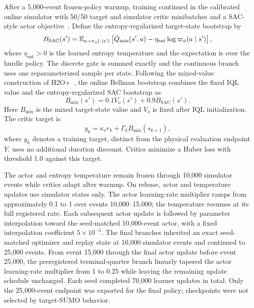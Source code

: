 After a 5,000-event frozen-policy warmup, training continued in the calibrated
online simulator with 50/50 target and simulator critic minibatches and a
SAC-style actor objective~\citep{haarnoja2018soft,haarnoja2018applications}.
Define the entropy-regularized target-state bootstrap by
\begin{equation}
B_{\mathrm{SAC}}(s')=
\mathbb{E}_{a\sim\pi_{\phi}(\cdot\mid s')}
\left[\bar Q_{\min}(s',a)-\eta_{\mathrm{ent}}
\log\varpi_{\phi}(a\mid s')\right],
\label{eq:sac_bootstrap}
\end{equation}
where $\eta_{\mathrm{ent}}>0$ is the learned entropy temperature and the
expectation is over the hurdle policy. The discrete gate is summed exactly and
the continuous branch uses one reparameterized sample per state.
Following the mixed-value construction of H2O+~\citep{niu2025h2oplus},
the online Bellman bootstrap combines the fixed IQL value and the
entropy-regularized SAC bootstrap as
\begin{equation}
B_{\mathrm{mix}}(s')=0.1V_{\nu}(s')+0.9B_{\mathrm{SAC}}(s').
\label{eq:mixed_backup}
\end{equation}
Here $B_{\mathrm{mix}}$ is the mixed target-state value and $V_{\nu}$ is
fixed after IQL initialization. The critic target is
\begin{equation}
y_k=\kappa_r r_k+\Gamma_k B_{\mathrm{mix}}(s_{k+1}),
\label{eq:critic_target}
\end{equation}
where $y_k$ denotes a training target, distinct from the physical evaluation
endpoint $Y$.  uses no additional duration discount.
Critics minimize a Huber loss with threshold 1.0 against this target.

The actor and entropy temperature remain frozen through 10,000 simulator
events while critics adapt after warmup. On release, actor and temperature
updates use simulator states only. The actor learning-rate multiplier ramps
from approximately 0.1 to 1 over events 10,000--15,000; the temperature resumes
at its full registered rate. Each subsequent actor update is followed by
parameter interpolation toward the seed-matched 10,000-event actor, with a
fixed interpolation coefficient $5\times10^{-5}$.
The final branches inherited an exact seed-matched optimizer and replay state
at 10,000 simulator events and continued to 25,000 events. From event 15,000
through the final actor update before event 25,000, the preregistered
terminal-quarter branch linearly tapered the actor learning-rate multiplier
from 1 to 0.25 while leaving the remaining update schedule unchanged.
Each seed completed 70,000 learner updates in total. Only the 25,000-event
endpoint was exported for the final policy; checkpoints were not selected by
target-SUMO behavior.

